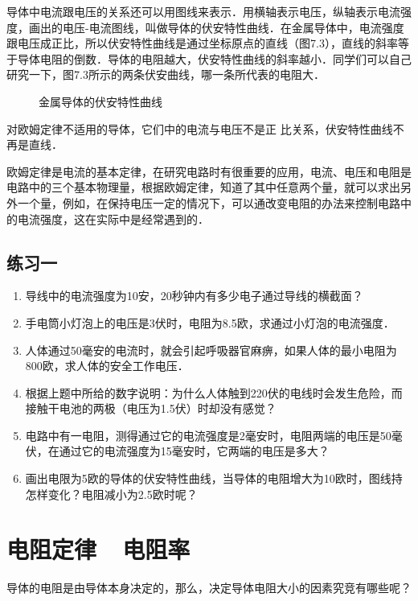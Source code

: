 导体中电流跟电压的关系还可以用图线来表示．用横轴表示电压，纵轴表示电流强度，画出的电压-电流图线，叫做导体的伏安特性曲线．在金属导体中，电流强度跟电压成正比，所以伏安特性曲线是通过坐标原点的直线（图7.3），直线的斜率等于导体电阻的倒数．导体的电阻越大，伏安特性曲线的斜率越小．同学们可以自己研究一下，图7.3所示的两条伏安曲线，哪一条所代表的电阻大．
\begin{figure}[htp]
    \centering
{}
    \caption{金属导体的伏安特性曲线}
\end{figure}


对欧姆定律不适用的导体，它们中的电流与电压不是正
比关系，伏安特性曲线不再是直线．

欧姆定律是电流的基本定律，在研究电路时有很重要的应用，电流、电压和电阻是电路中的三个基本物理量，根据欧姆定律，知道了其中任意两个量，就可以求出另外一个量，例如，在保持电压一定的情况下，可以通改变电阻的办法来控制电路中的电流强度，这在实际中是经常遇到的．


\subsection*{练习一}

\begin{enumerate}
    \item 导线中的电流强度为10安，20秒钟内有多少电子通过导线的横截面？
    \item 手电筒小灯泡上的电压是3伏时，电阻为8.5欧，求通过小灯泡的电流强度．
    \item 人体通过50毫安的电流时，就会引起呼吸器官麻痹，如果人体的最小电阻为800欧，求人体的安全工作电压．
    \item 根据上题中所给的数字说明：为什么人体触到220伏的电线时会发生危险，而接触干电池的两极（电压为1.5伏）时却没有感觉？
    \item 电路中有一电阻，测得通过它的电流强度是2毫安时，电阻两端的电压是50毫伏，在通过它的电流强度为15毫安时，它两端的电压是多大？
    \item 画出电限为5欧的导体的伏安特性曲线，当导体的电阻增大为10欧时，图线持怎样变化？电阻减小为2.5欧时呢？
\end{enumerate}


\section{电阻定律~~电阻率}
导体的电阻是由导体本身决定的，那么，决定导体电阻大小的因素究竞有哪些呢？


